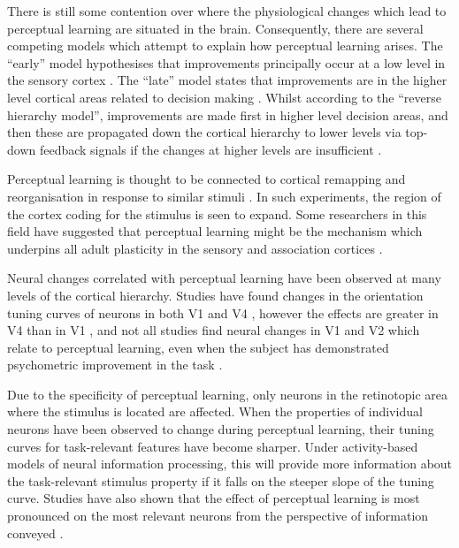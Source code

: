 There is still some contention over where the physiological changes which lead to perceptual learning are situated in the brain.
Consequently, there are several competing models which attempt to explain how perceptual learning arises.
The ``early'' model hypothesises that improvements principally occur at a low level in the sensory cortex \citep{Gilbert2001,Fahle2005}.
The ``late'' model states that improvements are in the higher level cortical areas related to decision making \citep{Yu2004}.
Whilst according to the ``reverse hierarchy model'', improvements are made first in higher level decision areas, and then these are propagated down the cortical hierarchy to lower levels via top-down feedback signals if the changes at higher levels are insufficient \citep{Ahissar2004,Hochstein2002}.


Perceptual learning is thought to be connected to cortical remapping and reorganisation in response to similar stimuli \citep{Dinse2003,Pleger2003,Polley2006}.
In such experiments, the region of the cortex coding for the stimulus is seen to expand.
Some researchers in this field have suggested that perceptual learning might be the mechanism which underpins all adult plasticity in the sensory and association cortices \citep{Gilbert2001}.


Neural changes correlated with perceptual learning have been observed at many levels of the cortical hierarchy.
Studies have found changes in the orientation tuning curves of neurons in both \ac{V1} \citep{Schoups2001} and \ac{V4} \citep{Li2004,Yang2004,Raiguel2006}, however the effects are greater in \ac{V4} than in \ac{V1} \citep{Raiguel2006}, and not all studies find neural changes in \ac{V1} and \ac{V2} which relate to perceptual learning, even when the subject has demonstrated psychometric improvement in the task \citep{Ghose2002}.

Due to the specificity of perceptual learning, only neurons in the retinotopic area where the stimulus is located are affected.
When the properties of individual neurons have been observed to change during perceptual learning, their tuning curves for task-relevant features have become sharper.
Under activity-based models of neural information processing, this will provide more information about the task-relevant stimulus property if it falls on the steeper slope of the tuning curve.
Studies have also shown that the effect of perceptual learning is most pronounced on the most relevant neurons from the perspective of information conveyed \citep{Raiguel2006}.


